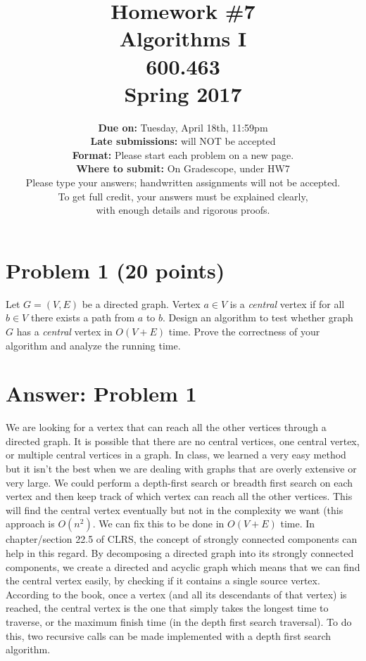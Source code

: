 \documentclass[letterpaper, 11pt]{article}
\begin{document}
\title{Homework \#7 \\ Algorithms I \\ 600.463 \\Spring 2017}
\author{\textbf{Due on:} Tuesday, April 18th, 11:59pm \\
\textbf{Late submissions:} will NOT be accepted\\
\textbf{Format:} Please start each problem on a new page.
\\\textbf{Where to submit:} On Gradescope, under HW7
\\ Please type your answers; handwritten assignments will not be accepted.
\\ To get full credit, your answers must be explained clearly,\\ with enough details
and rigorous proofs.
\\}

\maketitle


\section*{Problem 1 (20 points)}
Let $G = (V, E)$ be a directed graph. Vertex $a\in V$ is a \emph{central} vertex if for all $b\in V$ there exists a path from $a$ to $b$. 
Design an algorithm to test whether graph $G$ has a \emph{central} vertex in $O(V+E)$ time.
Prove the correctness of your algorithm and analyze the running time. 

\newpage
\section*{Answer: Problem 1}
We are looking for a vertex that can reach all the other vertices through a directed graph. It is possible that there are no central vertices, one central vertex, or multiple central vertices in a graph. In class, we learned a very easy method but it isn't the best when we are dealing with graphs that are overly extensive or very large. We could perform a depth-first search or breadth first search on each vertex and then keep track of which vertex can reach all the other vertices. This will find the central vertex eventually but not in the complexity we want (this approach is $O(n^2)$. We can fix this to be done in $O(V + E)$ time. In chapter/section 22.5 of CLRS, the concept of strongly connected components can help in this regard. By decomposing a directed graph into its strongly connected components, we create a directed and acyclic graph which means that we can find the central vertex easily, by checking if it contains a single source vertex. According to the book, once a vertex (and all its descendants of that vertex) is reached, the central vertex is the one that simply takes the longest time to traverse, or the maximum finish time (in the depth first search traversal). To do this, two recursive calls can be made implemented with a depth first search algorithm. 
\end{document}

